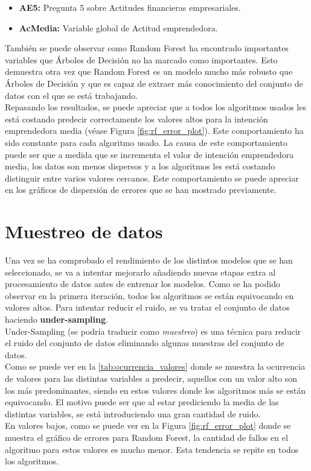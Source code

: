 \begin{itemize}
	\item\textbf{AE5:} Pregunta  5 sobre Actitudes financieras empresariales.
	\item\textbf{AcMedia:} Variable global de Actitud emprendedora.
\end{itemize}
También se puede observar como Random Forest ha encontrado importantes variables que Árboles de Decisión no ha marcado como importantes. Esto demuestra otra vez que Random Forest es un modelo mucho más robusto que Árboles de Decisión y que es capaz de extraer más conocimiento del conjunto de datos con el que se está trabajando.\\
\linebreak
Repasando los resultados, se puede apreciar que a todos los algoritmos usados les está costando predecir correctamente los valores altos para la intención emprendedora media (véase Figura \ref{fig:rf_error_plot}). Este comportamiento ha sido constante para cada algoritmo usado. La causa de este comportamiento puede ser que a medida que se incrementa el valor de intención emprendedora media, los datos son menos dispersos y a los algoritmos les está costando distinguir entre varios valores cercanos. Este comportamiento se puede apreciar en los gráficos de dispersión de errores que se han mostrado previamente.
\pagebreak
\section{Muestreo de datos}
Una vez se ha comprobado el rendimiento de los distintos modelos que se han seleccionado, se va a intentar mejorarlo añadiendo nuevas etapas extra al procesamiento de datos antes de entrenar los modelos.
\newline
Como se ha podido observar en la primera iteración, todos los algoritmos se están equivocando en valores altos. Para intentar reducir el ruido, se va tratar el conjunto de datos haciendo \textbf{under-sampling}.\\
Under-Sampling (se podría traducir como \textit{muestreo}) es una técnica para reducir el ruido del conjunto de datos eliminando algunas muestras del conjunto de datos.\\
\linebreak
Como se puede ver en la \ref{tab:ocurrencia_valores} donde se muestra la ocurrencia de valores para las distintas variables a predecir,  aquellos con un valor alto son los más predominantes, siendo en estos valores donde los algoritmos más se están equivocando. El motivo puede ser que al estar prediciendo la media de las distintas variables, se está introduciendo una gran cantidad de ruido. \\
En valores bajos, como se puede ver en la Figura \ref{fig:rf_error_plot} donde se muestra el gráfico de errores para Random Forest, la cantidad de fallos en el algoritmo para estos valores es mucho menor. Esta tendencia se repite en todos los algoritmos.\\

